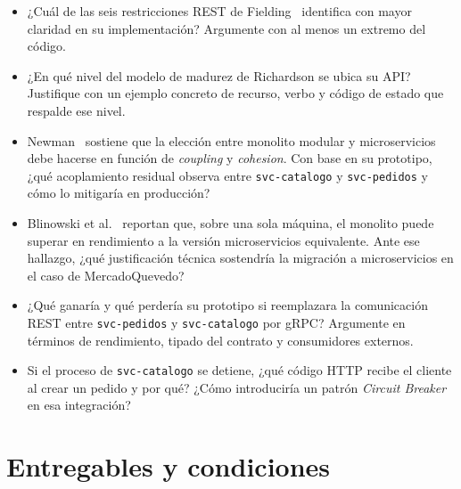 \documentclass[11pt,a4paper]{article}
\begin{document}
\begin{itemize}[leftmargin=1.2em, itemsep=0.3em]
    \item ¿Cuál de las seis restricciones REST de Fielding~\cite{Fielding2000REST} identifica con mayor claridad en su implementación? Argumente con al menos un extremo del código.
    \item ¿En qué nivel del modelo de madurez de Richardson se ubica su API? Justifique con un ejemplo concreto de recurso, verbo y código de estado que respalde ese nivel.
    \item Newman~\cite{Newman2021Microservices} sostiene que la elección entre monolito modular y microservicios debe hacerse en función de \emph{coupling} y \emph{cohesion}. Con base en su prototipo, ¿qué acoplamiento residual observa entre \texttt{svc-catalogo} y \texttt{svc-pedidos} y cómo lo mitigaría en producción?
    \item Blinowski et al.~\cite{Blinowski2022MonolithVsMS} reportan que, sobre una sola máquina, el monolito puede superar en rendimiento a la versión microservicios equivalente. Ante ese hallazgo, ¿qué justificación técnica sostendría la migración a microservicios en el caso de MercadoQuevedo?
    \item ¿Qué ganaría y qué perdería su prototipo si reemplazara la comunicación REST entre \texttt{svc-pedidos} y \texttt{svc-catalogo} por gRPC? Argumente en términos de rendimiento, tipado del contrato y consumidores externos.
    \item Si el proceso de \texttt{svc-catalogo} se detiene, ¿qué código HTTP recibe el cliente al crear un pedido y por qué? ¿Cómo introduciría un patrón \emph{Circuit Breaker}~\cite{Richardson2018Patterns} en esa integración?
\end{itemize}

\section{Entregables y condiciones}
\end{document}
